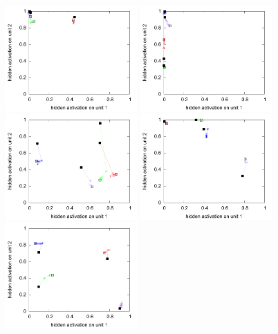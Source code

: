 \begin{figure}[H]
  \centering
  \includegraphics[width=0.45\textwidth]{img/hid-bal-bad-init.pdf}  
  \includegraphics[width=0.45\textwidth]{img/hid-bal-bad-convex.pdf}  \\
  \includegraphics[width=0.45\textwidth]{img/hid-bal-bad-step.pdf}  
  \includegraphics[width=0.45\textwidth]{img/hid-bal-bad-stagnation.pdf}  \\
  \includegraphics[width=0.45\textwidth]{img/hid-bal-good-init.pdf}  

\end{figure}
